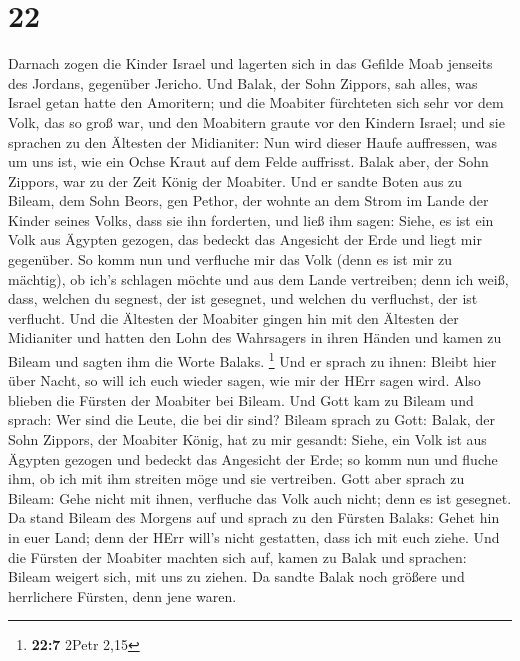 \hypertarget{section-21}{%
\section{22}\label{section-21}}

 Darnach zogen die Kinder Israel und lagerten sich in das
Gefilde Moab jenseits des Jordans, gegenüber Jericho.  Und
Balak, der Sohn Zippors, sah alles, was Israel getan hatte den
Amoritern;  und die Moabiter fürchteten sich sehr vor dem
Volk, das so groß war, und den Moabitern graute vor den Kindern Israel;
 und sie sprachen zu den Ältesten der Midianiter: Nun wird
dieser Haufe auffressen, was um uns ist, wie ein Ochse Kraut auf dem
Felde auffrisst. Balak aber, der Sohn Zippors, war zu der Zeit König der
Moabiter.  Und er sandte Boten aus zu Bileam, dem Sohn
Beors, gen Pethor, der wohnte an dem Strom im Lande der Kinder seines
Volks, dass sie ihn forderten, und ließ ihm sagen: Siehe, es ist ein
Volk aus Ägypten gezogen, das bedeckt das Angesicht der Erde und liegt
mir gegenüber.  So komm nun und verfluche mir das Volk
(denn es ist mir zu mächtig), ob ich's schlagen möchte und aus dem Lande
vertreiben; denn ich weiß, dass, welchen du segnest, der ist gesegnet,
und welchen du verfluchst, der ist verflucht.  Und die
Ältesten der Moabiter gingen hin mit den Ältesten der Midianiter und
hatten den Lohn des Wahrsagers in ihren Händen und kamen zu Bileam und
sagten ihm die Worte Balaks. \footnote{\textbf{22:7} 2Petr 2,15}
 Und er sprach zu ihnen: Bleibt hier über Nacht, so will
ich euch wieder sagen, wie mir der HErr sagen wird. Also blieben die
Fürsten der Moabiter bei Bileam.  Und Gott kam zu Bileam
und sprach: Wer sind die Leute, die bei dir sind?  Bileam
sprach zu Gott: Balak, der Sohn Zippors, der Moabiter König, hat zu mir
gesandt:  Siehe, ein Volk ist aus Ägypten gezogen und
bedeckt das Angesicht der Erde; so komm nun und fluche ihm, ob ich mit
ihm streiten möge und sie vertreiben.  Gott aber sprach
zu Bileam: Gehe nicht mit ihnen, verfluche das Volk auch nicht; denn es
ist gesegnet.  Da stand Bileam des Morgens auf und sprach
zu den Fürsten Balaks: Gehet hin in euer Land; denn der HErr will's
nicht gestatten, dass ich mit euch ziehe.  Und die
Fürsten der Moabiter machten sich auf, kamen zu Balak und sprachen:
Bileam weigert sich, mit uns zu ziehen.  Da sandte Balak
noch größere und herrlichere Fürsten, denn jene waren. 
